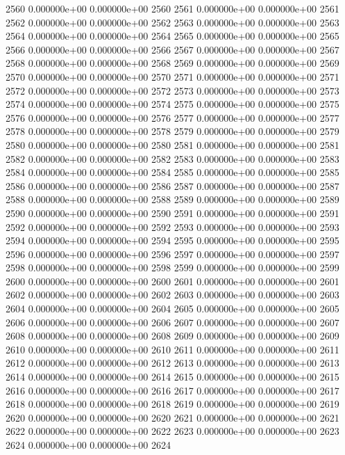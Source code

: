 \documentclass{article}
\begin{document}
\begin{Schunk}
\begin{Soutput}
2560   0.000000e+00   0.000000e+00 2560
2561   0.000000e+00   0.000000e+00 2561
2562   0.000000e+00   0.000000e+00 2562
2563   0.000000e+00   0.000000e+00 2563
2564   0.000000e+00   0.000000e+00 2564
2565   0.000000e+00   0.000000e+00 2565
2566   0.000000e+00   0.000000e+00 2566
2567   0.000000e+00   0.000000e+00 2567
2568   0.000000e+00   0.000000e+00 2568
2569   0.000000e+00   0.000000e+00 2569
2570   0.000000e+00   0.000000e+00 2570
2571   0.000000e+00   0.000000e+00 2571
2572   0.000000e+00   0.000000e+00 2572
2573   0.000000e+00   0.000000e+00 2573
2574   0.000000e+00   0.000000e+00 2574
2575   0.000000e+00   0.000000e+00 2575
2576   0.000000e+00   0.000000e+00 2576
2577   0.000000e+00   0.000000e+00 2577
2578   0.000000e+00   0.000000e+00 2578
2579   0.000000e+00   0.000000e+00 2579
2580   0.000000e+00   0.000000e+00 2580
2581   0.000000e+00   0.000000e+00 2581
2582   0.000000e+00   0.000000e+00 2582
2583   0.000000e+00   0.000000e+00 2583
2584   0.000000e+00   0.000000e+00 2584
2585   0.000000e+00   0.000000e+00 2585
2586   0.000000e+00   0.000000e+00 2586
2587   0.000000e+00   0.000000e+00 2587
2588   0.000000e+00   0.000000e+00 2588
2589   0.000000e+00   0.000000e+00 2589
2590   0.000000e+00   0.000000e+00 2590
2591   0.000000e+00   0.000000e+00 2591
2592   0.000000e+00   0.000000e+00 2592
2593   0.000000e+00   0.000000e+00 2593
2594   0.000000e+00   0.000000e+00 2594
2595   0.000000e+00   0.000000e+00 2595
2596   0.000000e+00   0.000000e+00 2596
2597   0.000000e+00   0.000000e+00 2597
2598   0.000000e+00   0.000000e+00 2598
2599   0.000000e+00   0.000000e+00 2599
2600   0.000000e+00   0.000000e+00 2600
2601   0.000000e+00   0.000000e+00 2601
2602   0.000000e+00   0.000000e+00 2602
2603   0.000000e+00   0.000000e+00 2603
2604   0.000000e+00   0.000000e+00 2604
2605   0.000000e+00   0.000000e+00 2605
2606   0.000000e+00   0.000000e+00 2606
2607   0.000000e+00   0.000000e+00 2607
2608   0.000000e+00   0.000000e+00 2608
2609   0.000000e+00   0.000000e+00 2609
2610   0.000000e+00   0.000000e+00 2610
2611   0.000000e+00   0.000000e+00 2611
2612   0.000000e+00   0.000000e+00 2612
2613   0.000000e+00   0.000000e+00 2613
2614   0.000000e+00   0.000000e+00 2614
2615   0.000000e+00   0.000000e+00 2615
2616   0.000000e+00   0.000000e+00 2616
2617   0.000000e+00   0.000000e+00 2617
2618   0.000000e+00   0.000000e+00 2618
2619   0.000000e+00   0.000000e+00 2619
2620   0.000000e+00   0.000000e+00 2620
2621   0.000000e+00   0.000000e+00 2621
2622   0.000000e+00   0.000000e+00 2622
2623   0.000000e+00   0.000000e+00 2623
2624   0.000000e+00   0.000000e+00 2624

\end{Soutput}
\end{Schunk}
\end{document}
